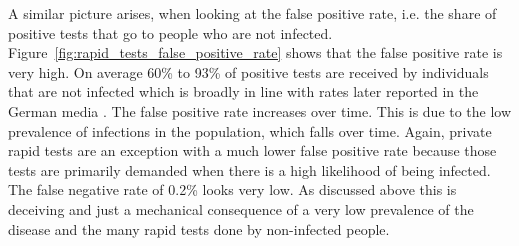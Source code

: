 \FloatBarrier

A similar picture arises, when looking at the false positive rate, i.e. the share of
positive tests that go to people who are not infected.
Figure~\ref{fig:rapid_tests_false_positive_rate} shows that the false positive rate is
very high. On average 60\% to 93\% of positive tests are received by individuals that
are not infected which is broadly in line with rates later reported in the German media
\citep{SueddeutscheZeitung2021c}. The false positive rate increases over time. This is
due to the low prevalence of infections in the population, which falls over time. Again,
private rapid tests are an exception with a much lower false positive rate because those
tests are primarily demanded when there is a high likelihood of being infected. The
false negative rate of 0.2\% looks very low. As discussed above this is deceiving and
just a mechanical consequence of a very low prevalence of the disease and the many rapid
tests done by non-infected people.

